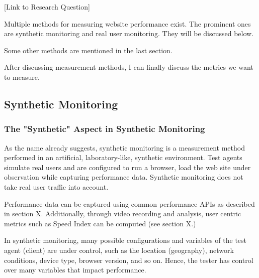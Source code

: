 [Link to Research Question]




Multiple methods for measuring website performance exist.
The prominent ones are synthetic monitoring and real user monitoring.
They will be discussed below.

Some other methods are mentioned in the last section.

After discussing measurement methods, I can finally discuss the metrics we want to measure.








\subsection{Synthetic Monitoring}


\subsubsection{The "Synthetic" Aspect in Synthetic Monitoring}


As the name already suggests, synthetic monitoring is a measurement method performed in an artificial, laboratory-like, synthetic environment.
Test agents simulate real users and are configured to run a browser, load the web site under observation while capturing performance data.
Synthetic monitoring does not take real user traffic into account. %

Performance data can be captured using common performance APIs as described in section X.
Additionally, through video recording and analysis,  user centric metrics such as Speed Index can be computed (see section X.) %

In synthetic monitoring, many possible configurations and variables of the test agent (client) are under control, such as the location (geography), network conditions, device type, browser version, and so on. %
Hence, the tester has control over many variables that impact performance.

